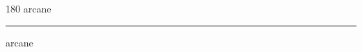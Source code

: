 
\begin{frame}
\begin{center}
\begin{turn}{180}
{\fontsize{2.5cm}{1em}\selectfont arcane}
\end{turn}
\vspace{1em}\par  
\hrule
\vspace{1em}\par  
{\fontsize{2.5cm}{1em}\selectfont arcane}
\end{center}
\end{frame}
